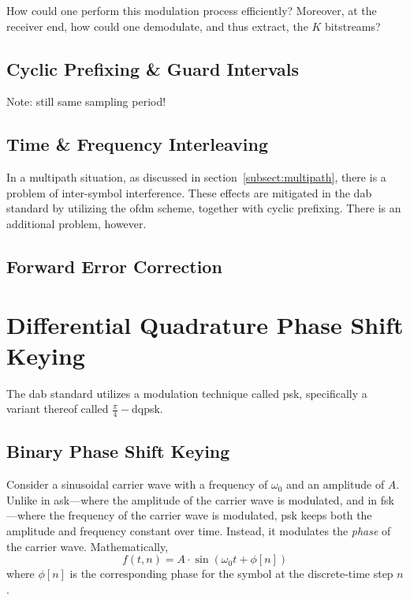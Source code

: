 \documentclass[class=report,11pt,crop=false]{standalone}
\begin{document}
How could one perform this modulation process efficiently? Moreover, at the receiver end, how could one demodulate, and thus extract, the \(K\) bitstreams?

\subsection{Cyclic Prefixing \& Guard Intervals}

\begin{figure}[htbp]
    \centering
    \captionsetup{type=figure}
    \def\svgwidth{1\linewidth}
    { %
        }
    \caption{}
    \label{fig:cyclic-prefix}
\end{figure}

Note: still same sampling period!


\subsection{Time \& Frequency Interleaving}
In a multipath situation, as discussed in section~\ref{subsect:multipath}, there is a problem of inter-symbol interference. These effects are mitigated in the \gls{dab} standard by utilizing the \gls{ofdm} scheme, together with cyclic prefixing. There is an additional problem, however. 

\begin{figure}[htbp]
    \centering
    \captionsetup{type=figure}
    \def\svgwidth{1\linewidth}
    { %
        }
    \caption{}
    \label{fig:ofdm-selective-fading}
\end{figure}


\subsection{Forward Error Correction}

\section{Differential Quadrature Phase Shift Keying \label{sect:dab-std_psk}}

The \gls{dab} standard utilizes a modulation technique called \acrlong{psk}, specifically a variant thereof called \(\frac{\pi}{4}-\)\gls{dqpsk}.

\subsection{Binary Phase Shift Keying}
Consider a sinusoidal carrier wave with a frequency of \(\omega_0\) and an amplitude of \(A\). Unlike in \gls{ask}---where the amplitude of the carrier wave is modulated, and in \gls{fsk}---where the frequency of the carrier wave is modulated, \gls{psk} keeps both the amplitude and frequency constant over time. Instead, it modulates the \emph{phase} of the carrier wave. Mathematically,
\begin{equation}
    f(t, n) = A \cdot \sin(\omega_0t + \phi[n])
\end{equation}
where \(\phi[n]\) is the corresponding phase for the symbol at the discrete-time step \(n\).
\end{document}
